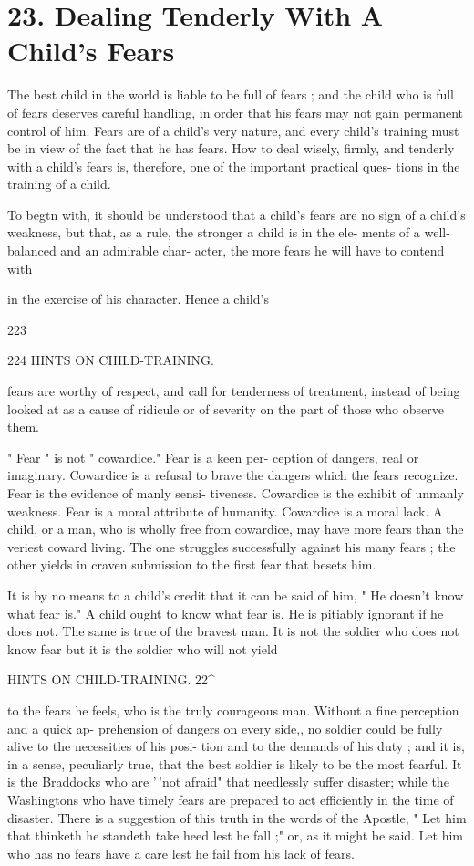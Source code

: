\documentclass[
]{book}
\begin{document}
\hypertarget{dealing-tenderly-with-a-childs-fears}{%
\chapter{23. Dealing Tenderly With A Child's Fears}\label{dealing-tenderly-with-a-childs-fears}}

The best child in the world is liable to be full of fears ; and the child who is full of fears deserves careful handling, in order that his fears may not gain permanent control of him. Fears are of a child's very nature, and every child's training must be in view of the fact that he has fears. How to deal wisely, firmly, and tenderly with a child's fears is, therefore, one of the important practical ques- tions in the training of a child.

To begtn with, it should be understood that a child's fears are no sign of a child's weakness, but that, as a rule, the stronger a child is in the ele- ments of a well-balanced and an admirable char- acter, the more fears he will have to contend with

in the exercise of his character. Hence a child's

223

224 HINTS ON CHILD-TRAINING.

fears are worthy of respect, and call for tenderness of treatment, instead of being looked at as a cause of ridicule or of severity on the part of those who observe them.

" Fear " is not " cowardice." Fear is a keen per- ception of dangers, real or imaginary. Cowardice is a refusal to brave the dangers which the fears recognize. Fear is the evidence of manly sensi- tiveness. Cowardice is the exhibit of unmanly weakness. Fear is a moral attribute of humanity. Cowardice is a moral lack. A child, or a man, who is wholly free from cowardice, may have more fears than the veriest coward living. The one struggles successfully against his many fears ; the other yields in craven submission to the first fear that besets him.

It is by no means to a child's credit that it can be said of him, " He doesn't know what fear is." A child ought to know what fear is. He is pitiably ignorant if he does not. The same is true of the bravest man. It is not the soldier who does not know fear but it is the soldier who will not yield

HINTS ON CHILD-TRAINING. 22\^{}

to the fears he feels, who is the truly courageous man. Without a fine perception and a quick ap- prehension of dangers on every side,, no soldier could be fully alive to the necessities of his posi- tion and to the demands of his duty ; and it is, in a sense, peculiarly true, that the best soldier is likely to be the most fearful. It is the Braddocks who are '\,'not afraid" that needlessly suffer disaster; while the Washingtons who have timely fears are prepared to act efficiently in the time of disaster. There is a suggestion of this truth in the words of the Apostle, " Let him that thinketh he standeth take heed lest he fall ;" or, as it might be said. Let him who has no fears have a care lest he fail from his lack of fears.
\end{document}
